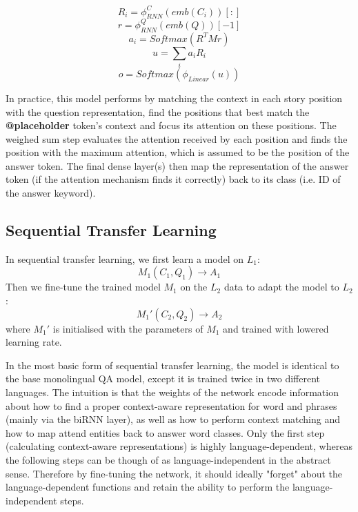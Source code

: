 \documentclass[]{article}
\begin{document}
\[ R_i = \phi_{RNN}^C(emb(C_i))[:] \] 
\[ r = \phi_{RNN}^Q(emb(Q))[-1] \]
\[ a_i = Softmax(R^T M r) \]
\[ u = \sum_i a_i R_i \]
\[ o = Softmax(\phi_{Linear}(u)) \]

In practice, this model performs by matching the context in each story position with the question representation, find the positions that best match the \textbf{@placeholder} token's context and focus its attention on these positions. The weighed sum step evaluates the attention received by each position and finds the position with the maximum attention, which is assumed to be the position of the answer token. The final dense layer(s) then map the representation of the answer token (if the attention mechanism finds it correctly) back to its class (i.e. ID of the answer keyword).

\subsection{Sequential Transfer Learning}

In sequential transfer learning, we first learn a model on $L_1$:
\[  M_1(C_1, Q_1) \to A_1\]
Then we fine-tune the trained model $M_1$ on the $L_2$ data to adapt the model to $L_2$:
\[  M_1'(C_2, Q_2) \to A_2\]
where $M_1'$ is initialised with the parameters of $M_1$ and trained with lowered learning rate.

In the most basic form of sequential transfer learning, the model is identical to the base monolingual QA model, except it is trained twice in two different languages. The intuition is that the weights of the network encode information about how to find a proper context-aware representation for word and phrases (mainly via the biRNN layer), as well as how to perform context matching and how to map attend entities back to answer word classes. Only the first step (calculating context-aware representations) is highly language-dependent, whereas the following steps can be though of as language-independent in the abstract sense. Therefore by fine-tuning the network, it should ideally "forget" about the language-dependent functions and retain the ability to perform the language-independent steps.
\end{document}
